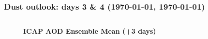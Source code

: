 \documentclass[aspectratio=169, 10pt]{beamer}
\begin{document}
\begin{frame}
\frametitle{Dust outlook: days 3 \& 4 ({\AdvanceDate[+3]\today}, {\AdvanceDate[+4]\today})}

\vspace{.2cm}

\begin{columns}
\begin{column}{0.5\textwidth}

\vspace{-1.5cm}
\begin{figure}
\textbf{ICAP AOD Ensemble Mean (+3 days)}\vspace{.1cm}\\
\end{figure}


\end{column}
\end{columns}
\end{frame}
\end{document}
